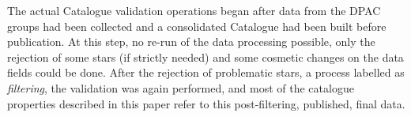%
%

The actual Catalogue validation operations began after data 
from the DPAC groups had been collected and a consolidated Catalogue 
had been built before publication. At this step, no re-run of the data processing
  possible, only the rejection of some stars (if strictly needed)
and some cosmetic changes on the data fields could be done.
After the rejection of problematic stars, 
a process labelled as {\it filtering},
the validation was again performed, and most of the catalogue properties 
described in this paper refer to this post-filtering, published, final {} data. 

